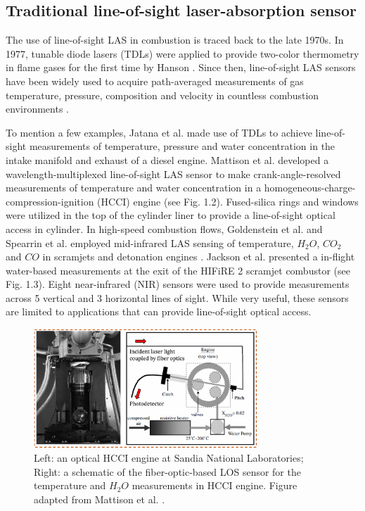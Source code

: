 \subsection{Traditional line-of-sight laser-absorption sensor}
The use of line-of-sight LAS in combustion is traced back to the late 1970s. In 1977, tunable diode lasers (TDLs) were applied to provide two-color thermometry in flame gases for the first time by Hanson \cite{Hanson19771479}. Since then, line-of-sight LAS sensors have been widely used to acquire path-averaged measurements of gas temperature, pressure, composition and velocity in countless combustion environments \cite{Goldenstein2017, HANSON20111, WOLFRUM19981,Allen1998, WERLE1998197, Lackner2007, Schulz2007, BOLSHOV201545, Eckbreth, Kohse, hanson2016spectroscopy}. 

To mention a few examples, Jatana et al. \cite{Jatana:15, Jatana2} made use of TDLs to achieve line-of-sight measurements of temperature, pressure and water concentration in the intake manifold and exhaust of a diesel engine. Mattison et al. \cite{Mattison2007} developed a wavelength-multiplexed line-of-sight LAS sensor to make crank-angle-resolved measurements of temperature and water concentration in a homogeneous-charge-compression-ignition (HCCI) engine (see Fig. 1.2). Fused-silica rings and windows were utilized in the top of the cylinder liner to provide a line-of-sight optical access in cylinder. In high-speed combustion flows, Goldenstein et al. \cite{goldenstein2014wavelength,goldenstein2014wavelength2} and Spearrin et al. \cite{spearrin1,spearrin2014quantum} employed mid-infrared LAS sensing of temperature, $H_2O$, $CO_2$ and $CO$ in scramjets and detonation engines \cite{goldenstein2015infrared}. Jackson et al. \cite{Jackson2015} presented a in-flight water-based measurements at the exit of the HIFiRE 2 scramjet combustor (see Fig. 1.3). Eight near-infrared (NIR) sensors were used to provide measurements across 5 vertical and 3 horizontal lines of sight. While very useful, these sensors are limited to applications that can provide line-of-sight optical access.

\begin{figure}[ht]
    \centering
        \includegraphics[width=0.75\textwidth]{fig/ch1_fig5.png}
        \caption{Left: an optical HCCI engine at Sandia National Laboratories; Right: a schematic of the fiber-optic-based LOS sensor for the temperature and $H_2O$ measurements in HCCI engine. Figure adapted from Mattison et al. \cite{Mattison2007}.}
    \label{fig:ch1_2}
\end{figure}

